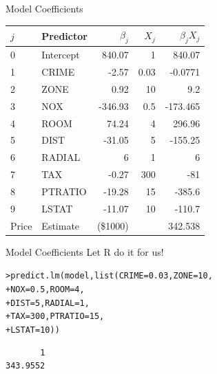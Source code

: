 \documentclass{beamer}\usepackage[]{graphicx}\usepackage[]{color}
\makeatletter
\newcommand{\hlnum}[1]{\textcolor[rgb]{0.824,0.412,0.118}{#1}}%
\newcommand{\hlstd}[1]{\textcolor[rgb]{1,0.894,0.769}{#1}}%
\newcommand{\hlkwc}[1]{\textcolor[rgb]{0.78,0.941,0.545}{#1}}%
\newcommand{\hlkwd}[1]{\textcolor[rgb]{1,0.78,0.769}{#1}}%
\newenvironment{kframe}{%
 \def\at@end@of@kframe{}%
 \ifinner\ifhmode%
  \def\at@end@of@kframe{\end{minipage}}%
  \begin{minipage}{\columnwidth}%
 \fi\fi%
 \def\FrameCommand##1{\hskip\@totalleftmargin \hskip-\fboxsep
 \colorbox{shadecolor}{##1}\hskip-\fboxsep
     \hskip-\linewidth \hskip-\@totalleftmargin \hskip\columnwidth}%
 \MakeFramed {\advance\hsize-\width
   \@totalleftmargin\z@ \linewidth\hsize
   \@setminipage}}%
 {\par\unskip\endMakeFramed%
 \at@end@of@kframe}
\newenvironment{knitrout}{}{} %
\makeatother
\begin{document}
\begin{darkframes}
\begin{frame}[fragile]{Model Coefficients}
\begin{table}[!b]
{\begin{tabularx}{\textwidth}{XXrrr}
           $j$ & Predictor  & $\beta_j$   &  $X_j$  & $\beta_j X_j$ \\ 
          \toprule
            0 & Intercept	&	840.07	&	1	&	840.07  \\
            1 & CRIME	&	-2.57	&	0.03	&	-0.0771  \\
            2 & ZONE	&	0.92	&	10	&	9.2  \\
            3 & NOX	&	-346.93	&	0.5	&	-173.465  \\
            4 & ROOM	&	74.24	&	4	&	296.96  \\
            5 & DIST	&	-31.05	&	5	&	-155.25  \\
            6 & RADIAL	&	6	&	1	&	6  \\
            7 & TAX	&	-0.27	&	300	&	-81  \\
            8 & PTRATIO	&	-19.28	&	15	&	-385.6  \\
            9 & LSTAT	&	-11.07	&	10	&	-110.7  \\
          \bottomrule
             Price &  Estimate 	& (\$1000)		&		&	342.538   \\
        
        
        \end{tabularx}}
        
      \end{table} 
      
    \end{frame}



    \begin{frame}[fragile]{Model Coefficients}
    \fontsize{9}{9}\selectfont
      Let R do it for us!
      
\begin{knitrout}
\begin{kframe}
\begin{alltt}
\hlstd{> }\hlkwd{predict.lm}\hlstd{(model,} \hlkwd{list}\hlstd{(}\hlkwc{CRIME}\hlstd{=}\hlnum{0.03}\hlstd{,} \hlkwc{ZONE}\hlstd{=}\hlnum{10}\hlstd{,}
\hlstd{+ }                       \hlkwc{NOX}\hlstd{=}\hlnum{0.5}\hlstd{,} \hlkwc{ROOM}\hlstd{=}\hlnum{4}\hlstd{,}
\hlstd{+ }                       \hlkwc{DIST}\hlstd{=}\hlnum{5}\hlstd{,}  \hlkwc{RADIAL}\hlstd{=}\hlnum{1}\hlstd{,}
\hlstd{+ }                       \hlkwc{TAX}\hlstd{=}\hlnum{300}\hlstd{,} \hlkwc{PTRATIO}\hlstd{=}\hlnum{15}\hlstd{,}
\hlstd{+ }                       \hlkwc{LSTAT}\hlstd{=}\hlnum{10}\hlstd{))}
\end{alltt}
\begin{verbatim}
       1 
343.9552 
\end{verbatim}
\end{kframe}
\end{knitrout}
      

\end{frame}
\end{darkframes}
\end{document}
